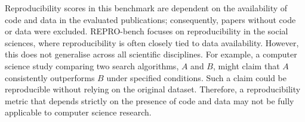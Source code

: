 \documentclass[letterpaper]{article} %
\newcommand{\nbc}[3]{
{\colorbox{#3}{\bfseries\sffamily\scriptsize\textcolor{white}{#1}}}
{\textcolor{#3}{\sf\small$\blacktriangleright$\textit{#2}$\blacktriangleleft$}}
}
\newcommand{\hh}[1]{\nbc{HH}{#1}{red}}
\begin{document}
Reproducibility scores in this benchmark are dependent on the availability of code and data in the evaluated publications; consequently, papers without code or data were excluded. REPRO-bench focuses on reproducibility in the social sciences, where reproducibility is often closely tied to data availability. However, this does not generalise across all scientific disciplines. For example, a computer science study comparing two search algorithms, $A$ and $B$, might claim that $A$ consistently outperforms $B$ under specified conditions. Such a claim could be reproducible without relying on the original dataset. Therefore, a reproducibility metric that depends strictly on the presence of code and data may not be fully applicable to computer science research.
\end{document}
